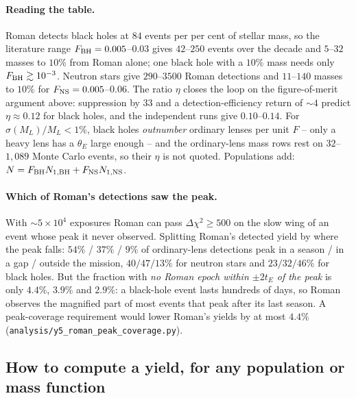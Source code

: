 \documentclass[english,10pt,a4paper]{article}
\begin{document}
	\paragraph{Reading the table.} Roman detects black holes at $84$ events per per cent of stellar mass, so the literature range $F_{\rm BH}=0.005$--$0.03$ gives $42$--$250$ events over the decade and $5$--$32$ masses to $10\%$ from Roman alone; one black hole with a $10\%$ mass needs only $F_{\rm BH}\gtrsim10^{-3}$. Neutron stars give $290$--$3500$ Roman detections and $11$--$140$ masses to $10\%$ for $F_{\rm NS} = 0.005$--$0.06$. The ratio $\eta$ closes the loop on the figure-of-merit argument above: suppression by $33$ and a detection-efficiency return of $\sim\!4$ predict $\eta\approx0.12$ for black holes, and the independent runs give $0.10$--$0.14$. For $\sigma(M_L)/M_L < 1\%$, black holes \emph{outnumber} ordinary lenses per unit $F$ -- only a heavy lens has a $\theta_E$ large enough -- and the ordinary-lens mass rows rest on $32$--$1{,}089$ Monte Carlo events, so their $\eta$ is not quoted. Populations add: $N = F_{\rm BH}N_{1,\rm BH} + F_{\rm NS}N_{1,\rm NS}$.

	\paragraph{Which of Roman's detections saw the peak.} With $\sim\!5\times10^4$ exposures Roman can pass $\Delta\chi^2\ge500$ on the slow wing of an event whose peak it never observed. Splitting Roman's detected yield by where the peak falls: $54\%$ / $37\%$ / $9\%$ of ordinary-lens detections peak in a season / in a gap / outside the mission, $40/47/13\%$ for neutron stars and $23/32/46\%$ for black holes. But the fraction with \emph{no Roman epoch within $\pm2t_E$ of the peak} is only $4.4\%$, $3.9\%$ and $2.9\%$: a black-hole event lasts hundreds of days, so Roman observes the magnified part of most events that peak after its last season. A peak-coverage requirement would lower Roman's yields by at most $4.4\%$ (\texttt{analysis/y5\_roman\_peak\_coverage.py}).

	\subsection{How to compute a yield, for any population or mass function}
\end{document}
